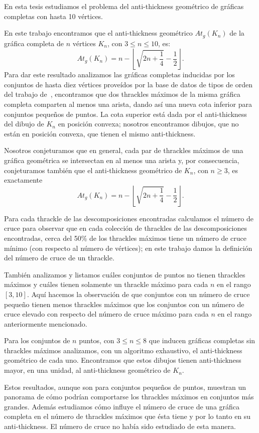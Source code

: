 En esta tesis estudiamos el problema del anti-thickness geométrico de gráficas completas con hasta 10
vértices.

En este trabajo encontramos que el anti-thickness geométrico $At_g(K_n)$ de la gráfica completa de $n$
vértices $K_n$, con $ 3 \leq n \leq 10$, es:
\[ At_g(K_n) =  n - \left\lfloor \sqrt{2n + \frac{1}{4}} - \frac{1}{2}\right\rfloor. \]
Para dar este resultado analizamos las gráficas completas inducidas por los conjuntos de hasta diez
vértices proveídos por la base de datos de tipos de orden del trabajo de~\cite{Aichholzer2001}, encontramos
que dos thrackles máximos de la misma gráfica completa comparten al menos una arista, dando así una nueva
cota inferior para conjuntos pequeños de puntos. La cota superior está dada por el anti-thickness del
dibujo de $K_n$ en posición convexa; nosotros encontramos dibujos, que no están en posición convexa, que
tienen el mismo anti-thickness.

Nosotros conjeturamos que en general, cada par de thrackles máximos de una gráfica geométrica se
intersectan en al menos una arista y, por consecuencia, conjeturamos también que el anti-thickness
geométrico de $K_n$, con $n \geq 3$, es exactamente \[ At_g(K_n) =  n - \left\lfloor \sqrt{2n +
\frac{1}{4}} - \frac{1}{2}\right\rfloor. \]

Para cada thrackle de las descomposiciones encontradas calculamos el número
de cruce para observar que en cada colección de thrackles de las descomposiciones encontradas, cerca del
50\% de los thrackles máximos tiene un número de cruce mínimo (con respecto al número de vértices); en este
trabajo damos la definición del número de cruce de un thrackle.

También analizamos y listamos cuáles conjuntos de puntos no tienen thrackles máximos y cuáles tienen
solamente un thrackle máximo para cada $n$ en el rango $[3,10]$. Aquí hacemos la observación de que
conjuntos con un número de cruce pequeño tienen menos thrackles máximos que los conjuntos con un número de
cruce elevado con respecto del número de cruce máximo para cada $n$ en el rango anteriormente mencionado.

Para los conjuntos de $n$ puntos, con $3 \leq n \leq 8$ que inducen gráficas completas sin thrackles
máximos analizamos, con un algoritmo exhaustivo, el anti-thickness geométrico de cada uno. Encontramos que
estos dibujos tienen anti-thickness mayor, en una unidad, al anti-thickness geométrico de $K_n$.

Estos resultados, aunque son para conjuntos pequeños de puntos, muestran un panorama de cómo podrían
comportarse los thrackles máximos en conjuntos más grandes. Además estudiamos cómo influye el número de
cruce de una gráfica completa en el número de thrackles máximos que ésta tiene y por lo tanto en su
anti-thickness. El número de cruce no había sido estudiado de esta manera.

